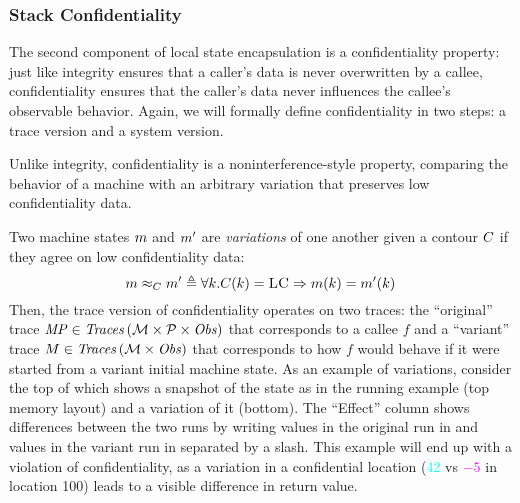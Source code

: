 \documentclass[acmsmall,review,anonymous]{acmart}\settopmatter{printfolios=true,printccs=false,printacmref=false}
\begin{document}
{%
%

\subsubsection{Stack Confidentiality}

The second component of local state encapsulation is a confidentiality
property: just like integrity ensures that a caller's data is never
overwritten by a callee, confidentiality ensures that the caller's data never
influences the callee's observable behavior. Again, we will formally define
confidentiality in two steps: a trace version and a system
version.

Unlike integrity, confidentiality is a noninterference-style property,
comparing the behavior of a machine with an arbitrary variation that
preserves low confidentiality data.

Two machine states \(m\) and \(m'\) are {\em variations}
of one another given a contour \(C\) if they agree on low
confidentiality data:
%
\[
m \approx_C m' \triangleq \forall k .
C(k) = \textsc{LC} \Rightarrow m(k) =
m'(k)
\]
%
Then, the trace version of confidentiality operates on two traces: the
``original'' trace $\mathit{MP} \in \mathit{Traces}\,({\mathcal M} \times \mathcal{P} \times \mathit{Obs})$ that corresponds to a callee $f$
and a ``variant'' trace $M \in \mathit{Traces}\,({\mathcal M} \times \mathit{Obs})$ that corresponds to how $f$
would behave if it were started from a variant initial machine state.
%
As an example of variations, consider the top of 
which shows a snapshot of the state as in the running example (top
memory layout) and a variation of it (bottom).
%
The ``Effect'' column shows differences between the two runs by writing values
in the original run in {\high} and values in the variant run in {\varied}
separated by a slash.
%
This example will end up with a violation of confidentiality, as a
variation in a confidential location (\textcolor{cyan}{42} vs
\textcolor{magenta}{$-5$} in location 100) leads to a visible
difference in return value.

}
\end{document}
